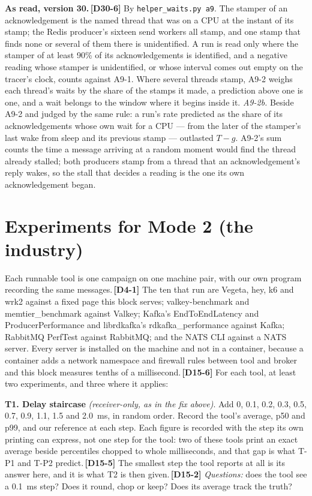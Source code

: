 \documentclass[11pt]{article}
\newcommand{\gl}[1]{{\color{soft}\itshape\small (#1)}}
\newcommand{\chgold}[1]{\,{\color{oldcol}\bfseries\footnotesize[#1]}}
\begin{document}
\textbf{As read, version 30.}\chgold{D30-6} By \texttt{helper\_waits.py a9}. The stamper of an acknowledgement is the named thread that was on a CPU at the instant of its stamp; the Redis producer's sixteen send workers all stamp, and one stamp that finds none or several of them there is unidentified. A run is read only where the stamper of at least 90\% of its acknowledgements is identified, and a negative reading whose stamper is unidentified, or whose interval comes out empty on the tracer's clock, counts against A9-1. Where several threads stamp, A9-2 weighs each thread's waits by the share of the stamps it made, a prediction above one is one, and a wait belongs to the window where it begins inside it. \emph{A9-2b.} Beside A9-2 and judged by the same rule: a run's rate predicted as the share of its acknowledgements whose own wait for a CPU --- from the later of the stamper's last wake from sleep and its previous stamp --- outlasted $T - g$. A9-2's sum counts the time a message arriving at a random moment would find the thread already stalled; both producers stamp from a thread that an acknowledgement's reply wakes, so the stall that decides a reading is the one its own acknowledgement began.

\section{Experiments for Mode 2 (the industry)}

Each runnable tool is one campaign on one machine pair, with our own program recording the same messages.\chgold{D4-1} The ten that run are Vegeta, hey, k6 and wrk2 against a fixed page this block serves; valkey-benchmark and memtier\_benchmark against Valkey; Kafka's EndToEndLatency and ProducerPerformance and librdkafka's rdkafka\_performance against Kafka; RabbitMQ PerfTest against RabbitMQ; and the NATS CLI against a NATS server. Every server is installed on the machine and not in a container, because a container adds a network namespace and firewall rules between tool and broker and this block measures tenths of a millisecond.\chgold{D15-6} For each tool, at least two experiments, and three where it applies:

\textbf{T1. Delay staircase} \gl{receiver-only, as in the fix above}. Add 0, 0.1, 0.2, 0.3, 0.5, 0.7, 0.9, 1.1, 1.5 and 2.0~ms, in random order. Record the tool's average, p50 and p99, and our reference at each step. Each figure is recorded with the step its own printing can express, not one step for the tool: two of these tools print an exact average beside percentiles chopped to whole milliseconds, and that gap is what T-P1 and T-P2 predict.\chgold{D15-5} The smallest step the tool reports at all is its answer here, and it is what T2 is then given.\chgold{D15-2} \emph{Questions:} does the tool see a 0.1~ms step? Does it round, chop or keep? Does its average track the truth?
\end{document}
